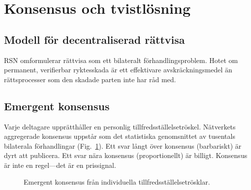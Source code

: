 \documentclass[11pt,a4paper,twocolumn]{article}
\begin{document}
\section{Konsensus och tvistlösning}

\subsection{Modell för decentraliserad rättvisa}

RSN omformulerar rättvisa som ett bilateralt förhandlingsproblem. Hotet om permanent, verifierbar ryktesskada är ett effektivare avskräckningsmedel än rättsprocesser som den skadade parten inte har råd med.

\subsection{Emergent konsensus}

Varje deltagare upprätthåller en personlig tillfredsställelsetröskel. Nätverkets aggregerade konsensus uppstår som det statistiska genomsnittet av tusentals bilaterala förhandlingar (Fig.~\ref{fig:consensus}). Ett svar långt över konsensus (barbariskt) är dyrt att publicera. Ett svar nära konsensus (proportionellt) är billigt. Konsensus är inte en regel---det är en prissignal.

\begin{figure}[ht]
\centering
{}
\caption{Emergent konsensus från individuella tillfredsställelsetrösklar.}
\label{fig:consensus}
\end{figure}
\end{document}
